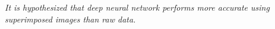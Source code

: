 \textit{It is hypothesized that deep neural network performs more accurate using superimposed images than raw data.}
  

